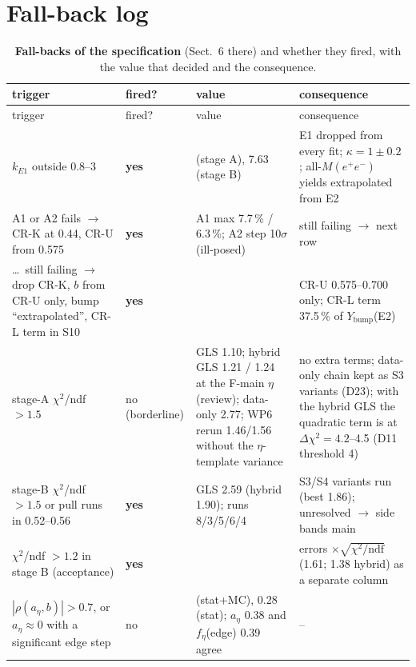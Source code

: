 \documentclass[11pt,a4paper]{article}
\renewcommand{\arraystretch}{1.15}
\newcommand{\Mee}{\ensuremath{M(e^{+}e^{-})}\xspace}
\newcommand{\aEta}{\ensuremath{a_\eta}\xspace}
\newcommand{\Ybump}{\ensuremath{Y_{\mathrm{bump}}}\xspace}
\newcommand{\kEone}{\ensuremath{k_{E1}}\xspace}
\begin{document}
\section{Fall-back log}
\label{app:fallback}
{\footnotesize
\setlength{\tabcolsep}{3pt}
\renewcommand{\arraystretch}{1.08}
\begin{longtable}{@{}>{\raggedright\arraybackslash}p{4.4cm} >{\raggedright\arraybackslash}p{1.6cm} >{\raggedright\arraybackslash}p{4.2cm} >{\raggedright\arraybackslash}p{\dimexpr\textwidth-10.2cm-6\tabcolsep\relax}@{}}
\caption{\textbf{Fall-backs of the specification} (Sect.~6 there) and whether they fired, with the value that decided and the consequence.}
\label{tab:fallback}\\
\toprule
trigger & fired? & value & consequence \\
\midrule
\endfirsthead
\toprule
trigger & fired? & value & consequence \\
\midrule
\endhead
\bottomrule
\endfoot
\kEone outside 0.8--3 & \textbf{yes} & 13.2 (stage A), 7.63 (stage B) & E1 dropped from every fit; $\kappa=1\pm0.2$; all-\Mee yields extrapolated from E2 \\
A1 or A2 fails $\to$ CR-K at 0.44, CR-U from 0.575 & \textbf{yes} & A1 max 7.7\,\% / 6.3\,\%; A2 step 10$\sigma$ (ill-posed) & still failing $\to$ next row \\
\dots\ still failing $\to$ drop CR-K, $b$ from CR-U only, bump ``extrapolated'', CR-L term in S10 & \textbf{yes} & & CR-U 0.575--0.700 only; CR-L term 37.5\,\% of \Ybump(E2) \\
stage-A $\chi^2$/ndf $>1.5$ & no (borderline) & GLS 1.10; hybrid GLS 1.21 / 1.24 at the F-main $\eta$ (review); data-only 2.77; WP6 rerun 1.46/1.56 without the $\eta$-template variance & no extra terms; data-only chain kept as S3 variants (D23); with the hybrid GLS the quadratic term is at $\Delta\chi^2=4.2$--4.5 (D11 threshold 4) \\
stage-B $\chi^2$/ndf $>1.5$ or pull runs in 0.52--0.56 & \textbf{yes} & GLS 2.59 (hybrid 1.90); runs 8/3/5/6/4 & S3/S4 variants run (best 1.86); unresolved $\to$ side bands main \\
$\chi^2$/ndf $>1.2$ in stage B (acceptance) & \textbf{yes} & 2.59 & errors $\times\sqrt{\chi^2/\mathrm{ndf}}$ (1.61; 1.38 hybrid) as a separate column \\
$|\rho(\aEta,b)|>0.7$, or $\aEta\approx0$ with a significant edge step & no & 0.05 (stat+MC), 0.28 (stat); \aEta 0.38 and $f_\eta$(edge) 0.39 agree & -- \\

\end{longtable}}
\end{document}
